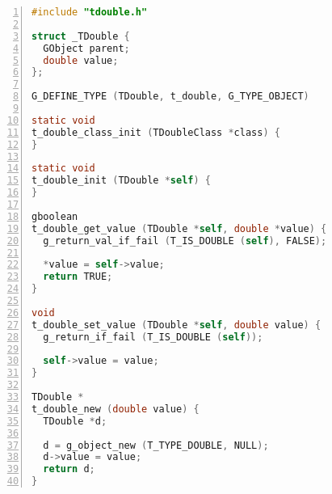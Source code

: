 \begin{lstlisting}[language=C, numbers=left]
#include "tdouble.h"

struct _TDouble {
  GObject parent;
  double value;
};

G_DEFINE_TYPE (TDouble, t_double, G_TYPE_OBJECT)

static void
t_double_class_init (TDoubleClass *class) {
}

static void
t_double_init (TDouble *self) {
}

gboolean
t_double_get_value (TDouble *self, double *value) {
  g_return_val_if_fail (T_IS_DOUBLE (self), FALSE);

  *value = self->value;
  return TRUE;
}

void
t_double_set_value (TDouble *self, double value) {
  g_return_if_fail (T_IS_DOUBLE (self));

  self->value = value;
}

TDouble *
t_double_new (double value) {
  TDouble *d;

  d = g_object_new (T_TYPE_DOUBLE, NULL);
  d->value = value;
  return d;
}
\end{lstlisting}

